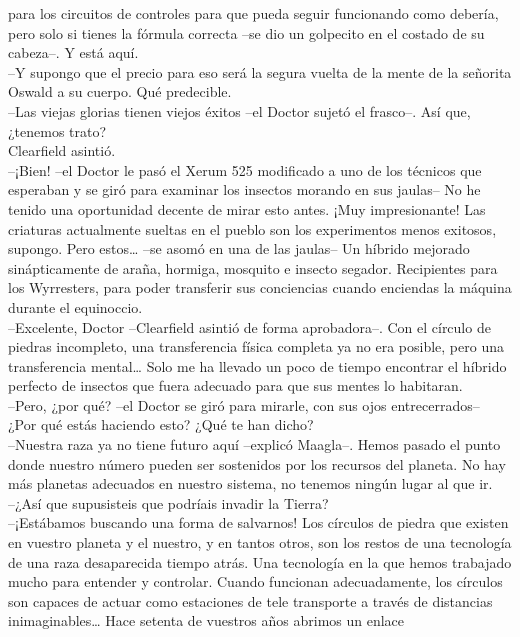 para los circuitos de controles para que pueda seguir funcionando como
debería, pero solo si tienes la fórmula correcta --se dio un golpecito
en el costado de su cabeza--. Y está aquí.\\
--Y supongo que el precio para eso será la segura vuelta de la mente de
la señorita Oswald a su cuerpo. Qué predecible.\\
--Las viejas glorias tienen viejos éxitos --el Doctor sujetó el
frasco--. Así que, ¿tenemos trato?\\
Clearfield asintió.\\
--¡Bien! --el Doctor le pasó el Xerum 525 modificado a uno de los
técnicos que esperaban y se giró para examinar los insectos morando en
sus jaulas-- No he tenido una oportunidad decente de mirar esto antes.
¡Muy impresionante! Las criaturas actualmente sueltas en el pueblo son
los experimentos menos exitosos, supongo. Pero estos\ldots{} --se asomó
en una de las jaulas-- Un híbrido mejorado sinápticamente de araña,
hormiga, mosquito e insecto segador. Recipientes para los Wyrresters,
para poder transferir sus conciencias cuando enciendas la máquina
durante el equinoccio.\\
--Excelente, Doctor --Clearfield asintió de forma aprobadora--. Con el
círculo de piedras incompleto, una transferencia física completa ya no
era posible, pero una transferencia mental\ldots{} Solo me ha llevado un
poco de tiempo encontrar el híbrido perfecto de insectos que fuera
adecuado para que sus mentes lo habitaran.\\
--Pero, ¿por qué? --el Doctor se giró para mirarle, con sus ojos
entrecerrados-- ¿Por qué estás haciendo esto? ¿Qué te han
dicho?\\[2\baselineskip]--Nuestra raza ya no tiene futuro aquí --explicó
Maagla--. Hemos pasado el punto donde nuestro número pueden ser
sostenidos por los recursos del planeta. No hay más planetas adecuados
en nuestro sistema, no tenemos ningún lugar al que ir.\\
--¿Así que supusisteis que podríais invadir la Tierra?\\
--¡Estábamos buscando una forma de salvarnos! Los círculos de piedra que
existen en vuestro planeta y el nuestro, y en tantos otros, son los
restos de una tecnología de una raza desaparecida tiempo atrás. Una
tecnología en la que hemos trabajado mucho para entender y controlar.
Cuando funcionan adecuadamente, los círculos son capaces de actuar como
estaciones de tele transporte a través de distancias
inimaginables\ldots{} Hace setenta de vuestros años abrimos un enlace
